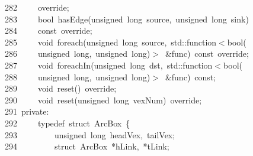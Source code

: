 \documentclass{ctexart}
\newcommand{\hlstd}[1]{\textcolor[rgb]{0.2,0.2,0.2}{#1}}
\newcommand{\hlopt}[1]{\textcolor[rgb]{0.2,0.2,0.2}{#1}}
\newcommand{\hllin}[1]{\textcolor[rgb]{0.59,0.59,0.59}{#1}}
\newcommand{\hlkwb}[1]{\textcolor[rgb]{0.63,0,0.31}{#1}}
\newcommand{\hlkwc}[1]{\textcolor[rgb]{0,0.63,0.31}{#1}}
\newcommand{\hlkwd}[1]{\textcolor[rgb]{0.78,0.23,0.41}{#1}}
\begin{document}
\hllin{282\ }\hlstd{}\hlstd{\ \ \ \ }\hlstd{override}\hlopt{;}\\
\hllin{283\ }\hlstd{}\hlstd{\ \ \ \ }\hlstd{}\hlkwb{bool\ }\hlstd{}\hlkwd{hasEdge}\hlstd{}\hlopt{(}\hlstd{}\hlkwb{unsigned\ long\ }\hlstd{source}\hlopt{,\ }\hlstd{}\hlkwb{unsigned\ long\ }\hlstd{sink}\hlopt{)\ }\Righttorque\\
\hllin{284\ }\hlstd{}\hlstd{\ \ \ \ }\hlstd{}\hlkwb{const\ }\hlstd{override}\hlopt{;}\\
\hllin{285\ }\hlstd{}\hlstd{\ \ \ \ }\hlstd{}\hlkwb{void\ }\hlstd{}\hlkwd{foreach}\hlstd{}\hlopt{(}\hlstd{}\hlkwb{unsigned\ long\ }\hlstd{source}\hlopt{,\ }\hlstd{}\hlkwc{std}\hlstd{}\hlopt{::}\hlstd{function}\hlopt{$<$}\hlstd{}\hlkwb{bool}\hlstd{}\hlopt{(}\Righttorque\\
\hllin{286\ }\hlstd{}\hlstd{\ \ \ \ }\hlstd{}\hlkwb{unsigned\ long}\hlstd{}\hlopt{,\ }\hlstd{}\hlkwb{unsigned\ long}\hlstd{}\hlopt{)$>$\ \&}\hlstd{func}\hlopt{)\ }\hlstd{}\hlkwb{const\ }\hlstd{override}\hlopt{;}\\
\hllin{287\ }\hlstd{}\hlstd{\ \ \ \ }\hlstd{}\hlkwb{void\ }\hlstd{}\hlkwd{foreachIn}\hlstd{}\hlopt{(}\hlstd{}\hlkwb{unsigned\ long\ }\hlstd{dst}\hlopt{,\ }\hlstd{}\hlkwc{std}\hlstd{}\hlopt{::}\hlstd{function}\hlopt{$<$}\hlstd{}\hlkwb{bool}\hlstd{}\hlopt{(}\Righttorque\\
\hllin{288\ }\hlstd{}\hlstd{\ \ \ \ }\hlstd{}\hlkwb{unsigned\ long}\hlstd{}\hlopt{,\ }\hlstd{}\hlkwb{unsigned\ long}\hlstd{}\hlopt{)$>$\ \&}\hlstd{func}\hlopt{)\ }\hlstd{}\hlkwb{const}\hlstd{}\hlopt{;}\\
\hllin{289\ }\hlstd{}\hlstd{\ \ \ \ }\hlstd{}\hlkwb{void\ }\hlstd{}\hlkwd{reset}\hlstd{}\hlopt{()\ }\hlstd{override}\hlopt{;}\\
\hllin{290\ }\hlstd{}\hlstd{\ \ \ \ }\hlstd{}\hlkwb{void\ }\hlstd{}\hlkwd{reset}\hlstd{}\hlopt{(}\hlstd{}\hlkwb{unsigned\ long\ }\hlstd{vexNum}\hlopt{)\ }\hlstd{override}\hlopt{;}\\
\hllin{291\ }\hlstd{}\hlkwc{private}\hlstd{}\hlopt{:}\\
\hllin{292\ }\hlstd{}\hlstd{\ \ \ \ }\hlstd{}\hlkwc{typedef\ }\hlstd{}\hlkwb{struct\ }\hlstd{ArcBox\ }\hlopt{\{}\\
\hllin{293\ }\hlstd{}\hlstd{\ \ \ \ \ \ \ \ }\hlstd{}\hlkwb{unsigned\ long\ }\hlstd{headVex}\hlopt{,\ }\hlstd{tailVex}\hlopt{;}\\
\hllin{294\ }\hlstd{}\hlstd{\ \ \ \ \ \ \ \ }\hlstd{}\hlkwb{struct\ }\hlstd{ArcBox\ }\hlopt{{*}}\hlstd{hLink}\hlopt{,\ {*}}\hlstd{tLink}\hlopt{;}\\
\end{document}
